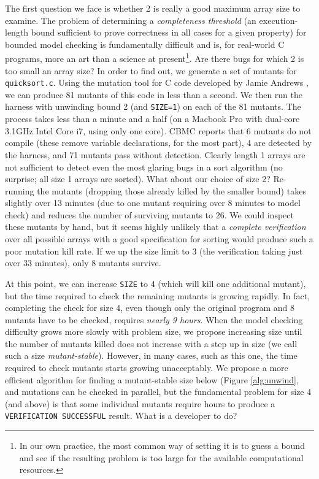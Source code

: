 \documentclass[conference]{IEEEtran}
\begin{document}
The first question we face is whether 2 is really a good maximum array
size to examine.  The problem of determining a \emph{completeness
  threshold} (an execution-length bound sufficient to prove correctness
in all cases for a given property) for bounded model checking is
fundamentally difficult \cite{CTDaniel} and is, for real-world C
programs, more an art than a science at present\footnote{In our own
  practice, the most common way of setting it is to guess a bound and
  see if the resulting problem is too large for the available
  computational resources.}.  Are there bugs for which 2 is too small
an array size?  In order to find out, we generate a set of mutants for
{\tt quicksort.c}.  Using the mutation tool for C code developed by
Jamie Andrews \cite{mutant}, we can produce 81 mutants of this code in
less than a second.  We then run the harness with unwinding bound 2
(and {\tt SIZE=1}) on each of the 81 mutants.  The process takes less
than a minute and a half (on a Macbook Pro with dual-core 3.1GHz Intel
Core i7, using only one core).  CBMC reports that 6 mutants do not
compile (these remove variable declarations, for the most part), 4 are
detected by the harness, and 71 mutants pass without detection.
Clearly length 1 arrays are not sufficient to detect even the most
glaring bugs in a sort algorithm (no surprise; all size 1 arrays are
sorted).  What about our choice of size 2?  Re-running the mutants
(dropping those already killed by the smaller bound) takes slightly
over 13 minutes (due to one mutant requiring over 8 minutes
to model check) and reduces the number of surviving mutants to 26.  We
could inspect these mutants by hand, but it seems highly unlikely that
a \emph{complete verification} over all possible arrays with a good
specification for sorting would produce such a poor mutation kill rate.
If we up the size limit to 3 (the verification taking just over 33
minutes), only 8 mutants survive. 

At this point, we can increase {\tt SIZE} to 4 (which will kill one
additional mutant), but the time required to check the remaining
mutants is growing rapidly.  In fact, completing the check for size 4,
even though only the original program and 8 mutants have to be
checked, requires \emph{nearly 9 hours}.  When the model checking
difficulty grows more slowly with problem size, we propose increasing
size until the number of mutants killed does not increase with a step
up in size (we call such a size \emph{mutant-stable}).  However, in
many cases, such as this one, the time required to check mutants
starts growing unacceptably.  We propose a more efficient algorithm
for finding a mutant-stable size below (Figure \ref{alg:unwind}, and
mutations can be checked in parallel, but the fundamental problem for
size 4 (and above) is that some individual mutants require hours to
produce a {\tt VERIFICATION SUCCESSFUL} result.  What is a developer
to do?
\end{document}
